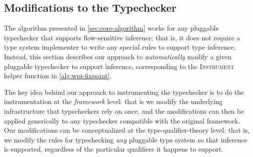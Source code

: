 \subsection{Modifications to the Typechecker}
\label{sec:instrument}

The algorithm presented in \cref{sec:core-algorithm} works for
any pluggable typechecker that supports flow-sensitive inference:
that is, it does not require a type system implementer to write
any special rules to support type inference. Instead, this section
describes our approach to \emph{automatically} modify a given
pluggable typechecker to support inference, corresponding to the
\textsc{Instrument} helper function in \cref{alg:wpi-fixpoint}.

The key idea behind our approach to instrumenting the typechecker
is to do the instrumentation at the \emph{framework} level: that is
we modify the underlying infrastructure that typecheckers rely on
once, and the modifications can then be applied generically to any
typechecker compatible with the original framework. Our modifications
can be conceptualized at the type-qualifier-theory level: that is,
we modify the rules for typechecking \emph{any} pluggable type system
so that inference is supported,
regardless of the particular qualifiers it happens to support.


